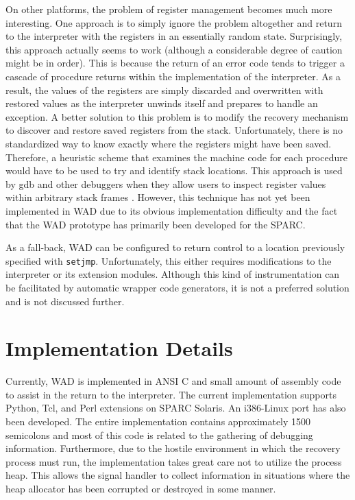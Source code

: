 On other platforms, the problem of register management becomes much
more interesting.  One approach is to simply ignore the problem
altogether and return to the interpreter with the registers in an
essentially random state.  Surprisingly, this approach actually seems to work (although a considerable degree of
caution might be in order).
This is because the return of an error code tends to trigger
a cascade of procedure returns within the implementation of the interpreter.
As a result, the values of the registers are simply discarded and
overwritten with restored values as the interpreter unwinds itself and prepares to handle an
exception.  A better solution to this problem is to modify the recovery mechanism to discover and
restore saved registers from the stack.  Unfortunately, there is
no standardized way to know exactly where the registers might have been saved.
Therefore, a heuristic scheme that examines the machine code for each procedure would
have to be used to try and identify stack locations. This approach is used by gdb
and other debuggers when they allow users to inspect register values
within arbitrary stack frames \cite{gdb}.  However, this technique has 
not yet been implemented in WAD due to its obvious implementation difficulty and the
fact that the WAD prototype has primarily been developed for the SPARC.

As a fall-back, WAD can be configured to return control to a location
previously specified with {\tt setjmp}.  Unfortunately, this either
requires modifications to the interpreter or its extension modules.
Although this kind of instrumentation can be facilitated by automatic
wrapper code generators, it is not a preferred solution and is
not discussed further.

\section{Implementation Details}

Currently, WAD is implemented in ANSI C and small amount of assembly
code to assist in the return to the interpreter.  The current
implementation supports Python, Tcl, and Perl extensions on SPARC Solaris.  An
i386-Linux port has also been developed.  The entire implementation contains 
approximately 1500 semicolons and most of this code is related to the gathering of debugging
information.  Furthermore, due to the hostile environment in which the
recovery process must run, the implementation takes great care not to utilize the
process heap.  This allows the signal handler to collect information in situations
where the heap allocator has been corrupted or destroyed in some manner.

